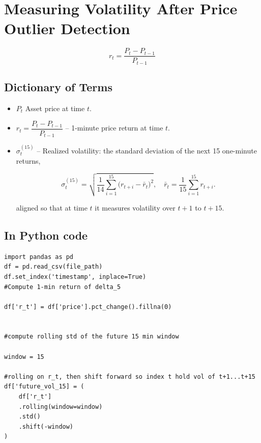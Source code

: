 \documentclass[12pt]{article}
\begin{document}
\newpage





\section*{Measuring Volatility After Price Outlier Detection}


\begin{equation}\label{eq:price_return}
    r_t = \frac{P_{t} - P_{t-1}}{P_{t-1}}
\end{equation}


\subsection*{Dictionary of Terms}

\begin{itemize}
    \item $P_t$  
      Asset price at time $t$.
    \item $r_t = \dfrac{P_t - P_{t-1}}{P_{t-1}}$  
      – 1-minute price return at time $t$.
    \item $\sigma^{\mathrm{(15)}}_{t}$  
      – Realized volatility: the standard deviation of the next 15 one-minute returns,
      
      

      
      \begin{equation}\label{eq:realized-vol}
        \sigma^{\mathrm{(15)}}_{t}
        = \sqrt{\frac{1}{14}\sum_{i=1}^{15}\bigl(r_{t+i}-\bar r_{t}\bigr)^{2}},
        \quad
        \bar r_{t} = \frac{1}{15}\sum_{i=1}^{15} r_{t+i}.
      \end{equation}
      



      aligned so that at time $t$ it measures volatility over $t+1$ to $t+15$.
\end{itemize}



\subsection*{In Python code}

\begin{verbatim}
import pandas as pd
df = pd.read_csv(file_path)
df.set_index('timestamp', inplace=True)
#Compute 1-min return of delta_5

df['r_t'] = df['price'].pct_change().fillna(0)


#compute rolling std of the future 15 min window

window = 15

#rolling on r_t, then shift forward so index t hold vol of t+1...t+15
df['future_vol_15] = (
    df['r_t']
    .rolling(window=window)
    .std()
    .shift(-window)
)
\end{verbatim}
\end{document}
